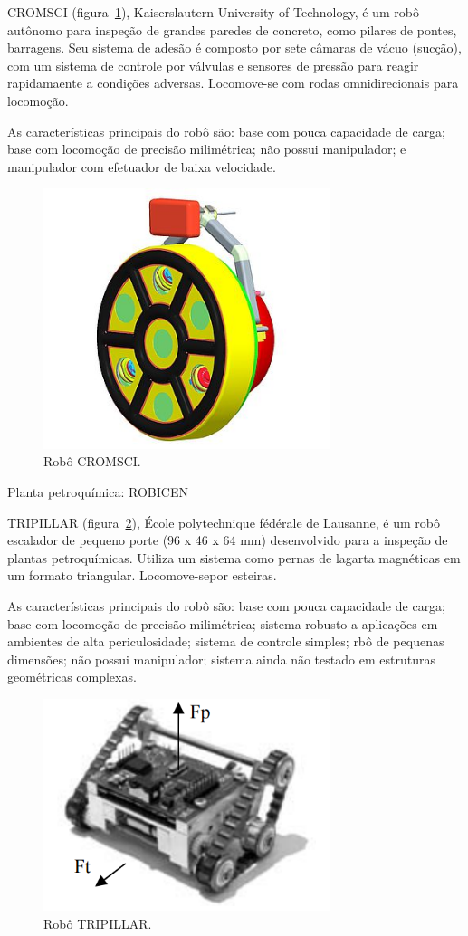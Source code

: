CROMSCI (figura~\ref{cromsci}), Kaiserslautern University of Technology, é um
robô autônomo para inspeção de grandes paredes de concreto, como pilares de pontes, barragens. Seu
sistema de adesão é composto por sete câmaras de vácuo (sucção), com um sistema
de controle por válvulas e sensores de pressão para reagir rapidamaente a
condições adversas. Locomove-se com rodas omnidirecionais para locomoção.

As características principais do robô são: base com pouca capacidade de
carga; base com locomoção de precisão milimétrica; não possui manipulador; e
manipulador com efetuador de baixa velocidade.

\begin{figure}[ht]
\centering
\includegraphics[width=8.4cm]{figs/climbers/cromsci.jpg}
\caption{Robô CROMSCI.}
\label{cromsci}
\end{figure}

Planta petroquímica: ROBICEN

TRIPILLAR (figura~\ref{tripillar}), École polytechnique fédérale de Lausanne, é
um robô escalador de pequeno porte (96 x 46 x 64 mm) desenvolvido para a inspeção de plantas
petroquímicas. Utiliza um sistema como pernas de lagarta magnéticas em um
formato triangular. Locomove-sepor esteiras.

As características principais do robô são: base com pouca capacidade de
carga; base com locomoção de precisão milimétrica; sistema robusto a aplicações
em ambientes de alta periculosidade; sistema de controle simples; rbô de
pequenas dimensões; não possui manipulador; sistema ainda não testado em estruturas geométricas complexas.


\begin{figure}[ht]
\centering
\includegraphics[width=8.4cm]{figs/climbers/tripillar.png}
\caption{Robô TRIPILLAR.}
\label{tripillar}
\end{figure}
   
